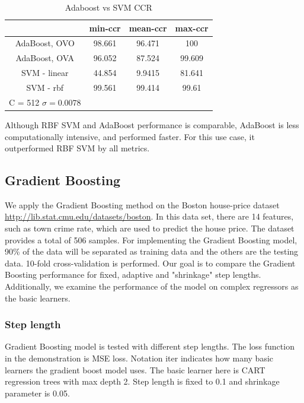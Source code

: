 \documentclass[10pt,twocolumn,letterpaper]{article}
\begin{document}
\begin{table}[ht]
\centering
\caption{Adaboost vs SVM CCR}
 \begin{tabular}{||c c c c||} 
 \hline
  & min-ccr & mean-ccr & max-ccr \\ 
 \hline\hline
AdaBoost, OVO & 98.661 & 96.471 & 100  \\ 
 \hline\hline
AdaBoost, OVA &96.052 & 87.524 & 99.609 \\ 
\hline\hline
SVM - linear & 44.854 & 9.9415 & 81.641 \\ 
\hline\hline
SVM - rbf & 99.561 & 99.414 & 99.61 \\
C = 512 $\sigma = 0.0078$ & & & \\
 \hline \hline
\end{tabular}
\label{table:adaccr}
\end{table}
\indent Although RBF SVM and AdaBoost performance is comparable, AdaBoost is less computationally  intensive, and performed faster. For this use case, it outperformed RBF SVM by all metrics.

\subsection{Gradient Boosting}
 We apply the Gradient Boosting method on the Boston house-price dataset \url{http://lib.stat.cmu.edu/datasets/boston}. In this data set, there are 14 features, such as town crime rate, which are used to predict the house price. The dataset provides a total of 506 samples. For implementing the Gradient Boosting model, 90\% of the data will be separated as training data and the others are the testing data. 10-fold cross-validation is performed. Our goal is to compare the Gradient Boosting performance for fixed, adaptive and "shrinkage" step lengths. Additionally, we examine the performance of the model on complex regressors as the basic learners. 

\subsubsection{Step length}

Gradient Boosting model is tested with different step lengths. The loss function in the demonstration is MSE loss. Notation iter indicates how many basic learners the gradient boost model uses. The basic learner here is CART regression trees with max depth 2. Step length is fixed to 0.1 and shrinkage parameter is 0.05.
\end{document}
